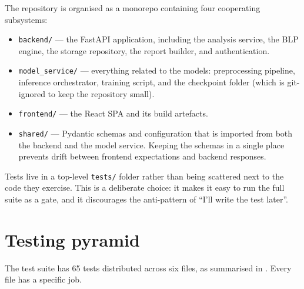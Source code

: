 \documentclass[11pt,a4paper,oneside]{report}
\begin{document}
The repository is organised as a monorepo containing four
cooperating subsystems:

\begin{itemize}
    \item \texttt{backend/} --- the FastAPI application, including
        the analysis service, the BLP engine, the storage
        repository, the report builder, and authentication.
    \item \texttt{model\_service/} --- everything related to the
        models: preprocessing pipeline, inference orchestrator,
        training script, and the checkpoint folder (which is
        git-ignored to keep the repository small).
    \item \texttt{frontend/} --- the React SPA and its build
        artefacts.
    \item \texttt{shared/} --- Pydantic schemas and configuration
        that is imported from both the backend and the model
        service. Keeping the schemas in a single place prevents
        drift between frontend expectations and backend responses.
\end{itemize}

Tests live in a top-level \texttt{tests/} folder rather than being
scattered next to the code they exercise. This is a deliberate
choice: it makes it easy to run the full suite as a gate, and it
discourages the anti-pattern of ``I'll write the test later''.

\section{Testing pyramid}

The test suite has 65 tests distributed across six files, as
summarised in . Every file has a specific job.
\end{document}
